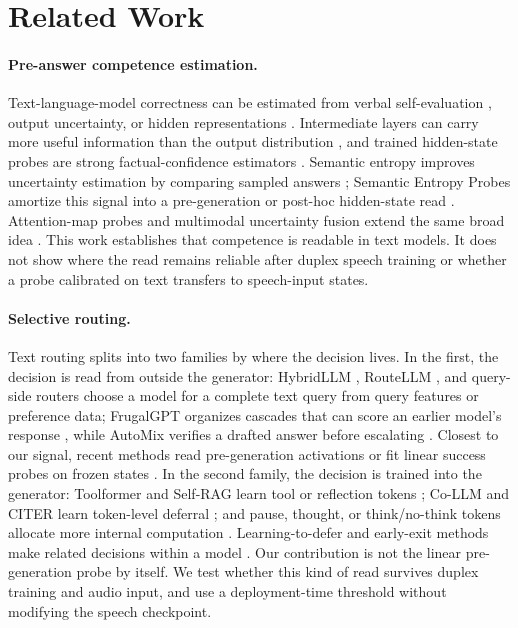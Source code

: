\section{Related Work}
\label{sec:related}

\paragraph{Pre-answer competence estimation.}
Text-language-model correctness can be estimated from verbal
self-evaluation \citep{kadavath2022language,lin2022teaching}, output
uncertainty, or hidden representations
\citep{azaria2023internal,burns2023discovering,marks2024geometry}.
Intermediate layers can carry more useful information than the output
distribution \citep{orgad2024llms}, and trained hidden-state probes are
strong factual-confidence estimators \citep{mahaut2024factual}.
Semantic entropy improves uncertainty estimation by comparing sampled
answers \citep{kuhn2023semantic,farquhar2024detecting}; Semantic
Entropy Probes amortize this signal into a pre-generation or post-hoc
hidden-state read \citep{kossen2024semantic}. Attention-map probes and
multimodal uncertainty fusion extend the same broad idea
\citep{chuang2024lookback,umui2026}. This work establishes that
competence is readable in text models. It does not show where the read
remains reliable after duplex speech training or whether a probe
calibrated on text transfers to speech-input states.

\paragraph{Selective routing.}
Text routing splits into two families by where the decision lives.
In the first, the decision is read from outside the generator:
HybridLLM \citep{ding2024hybrid}, RouteLLM
\citep{ong2024routellm}, and query-side routers
\citep{hybridserve2025,hu2024routerbench,llmrouterbench2026} choose a
model for a complete text query from query features or preference
data; FrugalGPT organizes cascades that can score an earlier model's
response \citep{chen2023frugalgpt}, while AutoMix verifies a drafted
answer before escalating \citep{aggarwal2024automix}. Closest to our
signal, recent methods read pre-generation activations or fit linear
success probes on frozen states
\citep{varshney2026llmrouter,lugoloobi2025difficulty,
lugoloobi2026failures}. In the second family, the decision is trained
into the generator: Toolformer and Self-RAG learn tool or reflection
tokens \citep{schick2023toolformer,asai2024selfrag}; Co-LLM and CITER
learn token-level deferral
\citep{shen2024collaborative,zheng2025citer}; and pause, thought, or
think/no-think tokens allocate more internal computation
\citep{goyal2024pause,zelikman2024quietstar,yang2025qwen3,
guo2025deepseekr1}. Learning-to-defer and early-exit methods make
related decisions within a model
\citep{madras2018predict,schuster2022confident}. Our contribution is
not the linear pre-generation probe by itself. We test whether this
kind of read survives duplex training and audio input, and use a
deployment-time threshold without modifying the speech checkpoint.

